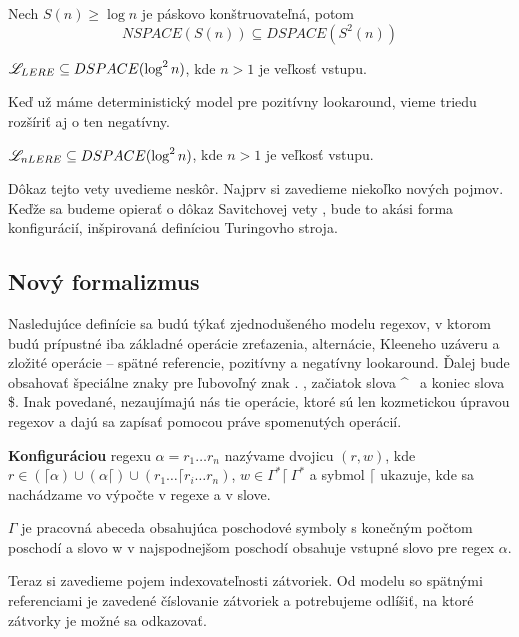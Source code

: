 \begin{veta}
Nech $S(n)\geq \log n$ je páskovo konštruovateľná, potom 
$$ NSPACE(S(n)) \subseteq DSPACE(S^2(n)) $$
\end{veta}

\begin{dosledok}\label{le_dspace_log2n}
$\mathscr{L}_{LERE} \subseteq DSPACE(\log^2 n)$, kde $n>1$ je veľkosť vstupu.
\end{dosledok}

Keď už máme deterministický model pre pozitívny lookaround, vieme triedu rozšíriť aj o ten negatívny.
\begin{veta}\label{dspace_log2n}
$\mathscr{L}_{nLERE} \subseteq DSPACE(\log^2 n)$, kde $n>1$ je veľkosť vstupu.
\end{veta}
Dôkaz tejto vety uvedieme neskôr. Najprv si zavedieme niekoľko nových pojmov. Keďže sa budeme opierať o dôkaz Savitchovej vety \cite{Savitch_skripta}, bude to akási forma konfigurácií, inšpirovaná definíciou Turingovho stroja.

\subsection{Nový formalizmus}

Nasledujúce definície sa budú týkať zjednodušeného modelu regexov, v ktorom budú prípustné iba základné operácie zreťazenia, alternácie, Kleeneho uzáveru a zložité operácie -- spätné referencie, pozitívny a negatívny lookaround. Ďalej bude obsahovať špeciálne znaky pre ľubovoľný znak . , začiatok slova \textasciicircum~ a koniec slova \$. Inak povedané, nezaujímajú nás tie operácie, ktoré sú len kozmetickou úpravou regexov a dajú sa zapísať pomocou práve spomenutých operácií.

\begin{df}
\textbf{Konfiguráciou} regexu $\alpha = r_1 \dots r_n$ nazývame dvojicu $(r, w)$, kde $r \in (\lceil\alpha)\cup(\alpha\lceil)\cup(r_1 \dots \lceil r_i \dots r_n)$, $w \in \Gamma^*\lceil~ \Gamma^*$ a sybmol $\lceil$ ukazuje, kde sa nachádzame vo výpočte v regexe a v slove.

$\Gamma$ je pracovná abeceda obsahujúca poschodové symboly s konečným počtom poschodí a slovo w v najspodnejšom poschodí obsahuje vstupné slovo pre regex $\alpha$.
\end{df}

Teraz si zavedieme pojem indexovateľnosti zátvoriek. Od modelu so spätnými referenciami je zavedené číslovanie zátvoriek a potrebujeme odlíšiť, na ktoré zátvorky je možné sa odkazovať.

